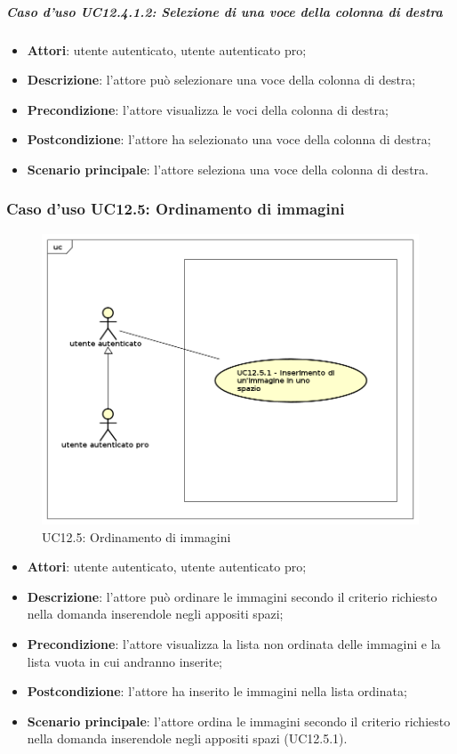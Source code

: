 \subparagraph{Caso d'uso UC12.4.1.2: Selezione di una voce della colonna di destra}
\begin{itemize}
\item \textbf{Attori}: utente autenticato, utente autenticato pro;
\item \textbf{Descrizione}: l'attore può selezionare una voce della colonna di destra;
\item \textbf{Precondizione}: l'attore visualizza le voci della colonna di destra;
\item \textbf{Postcondizione}: l'attore ha selezionato una voce della colonna di destra;
\item \textbf{Scenario principale}: l'attore seleziona una voce della colonna di destra. 
\end{itemize}

\subsubsection{Caso d'uso UC12.5: Ordinamento di immagini}
\begin{figure}[h]
	\centering
	\includegraphics[scale=0.5]{UML/UC12_5.png}
	\caption{UC12.5: Ordinamento di immagini}
\end{figure}
\begin{itemize}
\item \textbf{Attori}: utente autenticato, utente autenticato pro;
\item \textbf{Descrizione}: l'attore può ordinare le immagini secondo il criterio richiesto nella domanda inserendole negli appositi spazi;
\item \textbf{Precondizione}: l'attore visualizza la lista non ordinata delle immagini e la lista vuota in cui andranno inserite;
\item \textbf{Postcondizione}: l'attore ha inserito le immagini nella lista ordinata;
\item \textbf{Scenario principale}: l'attore ordina le immagini secondo il criterio richiesto nella domanda inserendole negli appositi spazi (UC12.5.1).
\end{itemize}

